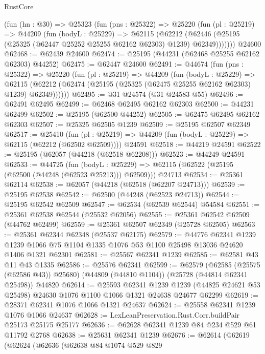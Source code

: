 \begin{lexlean}{RustCore}
\begin{coremodule}
    (fun (hn : @30) =>
    @25323
      (fun (pns : @25322) =>
      @25220
        (fun (pl : @25219) =>
        @44209
          (fun (bodyL : @25229) =>
          @62115
            (@62212
              (@62446 (@25195 (@25325 (@62447 @25252 @25255 @62162 @62303) @1239) @62349)))))))
    @24600
@62468 := @62439 @24600
@62474 := @25195 (@44231 (@62468 @25255 @62162 @62303) @44252)
@62475 := @62447 @24600
@62491 := @44674
    (fun (pns : @25322) =>
    @25220
      (fun (pl : @25219) =>
      @44209
        (fun (bodyL : @25229) =>
        @62115 (@62212 (@62474 (@25195 (@25325 (@62475 @25255 @62162 @62303) @1239) @62349))))))
@62495 := @31 @24574 (@31 @24583 @55)
@62496 := @62491 @62495
@62499 := @62468 @62495 @62162 @62303
@62500 := @44231 @62499
@62502 := @25195 (@62500 @44252)
@62505 := @62475 @62495 @62162 @62303
@62507 := @25325 @62505 @1239
@62509 := @25195 @62507 @62349
@62517 := @25410
    (fun (pl : @25219) => @44209 (fun (bodyL : @25229) => @62115 (@62212 (@62502 @62509))))
    @24591
@62518 := @44219 @24591
@62522 := @25195 (@62057 (@44218 (@62518 @62208)))
@62523 := @44249 @24591
@62533 := @44725
    (fun (bodyL : @25229) => @62115 (@62522 (@25195 (@62500 (@44248 (@62523 @25213))) @62509)))
    @24713
@62534 := @25361 @62114
@62538 := @62057 (@44218 (@62518 (@62207 @24713)))
@62539 := @25195 @62538
@62542 := @62500 (@44248 (@62523 @24713))
@62544 := @25195 @62542 @62509
@62547 := @62534 (@62539 @62544) @54584
@62551 := @25361 @62538 @62544 (@25532 @62056)
@62555 := @25361 @62542 @62509 (@44762 @62499)
@62559 := @25361 @62507 @62349 (@25728 @62505)
@62563 := @25361 @62344 @62348 (@25537 @62175)
@62579 := @44776
    @62341
    @1239
    @1239
    @1066
    @75
    @1104
    @1335
    @1076
    @53
    @1100
    @25498
    @13036
    @24620
    @1406
    @1321
    @62301
@62581 := @25567 @62341 @1239
@62585 := @62581 @43 @11 @43 @1335
@62586 := @25576 @62341
@62599 := @62579
    (@62585 (@25575 (@62586 @43)) @25680)
    (@44809 (@44810 @1104))
    (@25728 (@44814 @62341 @25498))
    @44820
@62614 := @25593
    @62341
    @1239
    @1239
    (@44825 @24621 @53 @25498)
    @24630
    @1076
    @1100
    @1066
    @1321
    @24638
    @24677
    @62299
@62619 := @28371 @62341 @1076 @1066 @1321 @24637
@62624 := @25558 @62341 @1239 @1076 @1066 @24637
@62628 := LexLeanPreservation.Rust.Corr.buildPair @25173 @25175 @25177
@62636 := @62628 @62341 @1239 @84 @234 @529 @61 @11792 @2768
@62638 := @25631 @62341 @1239
@62676 := @62614
    (@62619
      (@62624
        (@62636
          (@62638
            @84
            @1074
            @529
            @829

\end{coremodule}
\end{lexlean}
